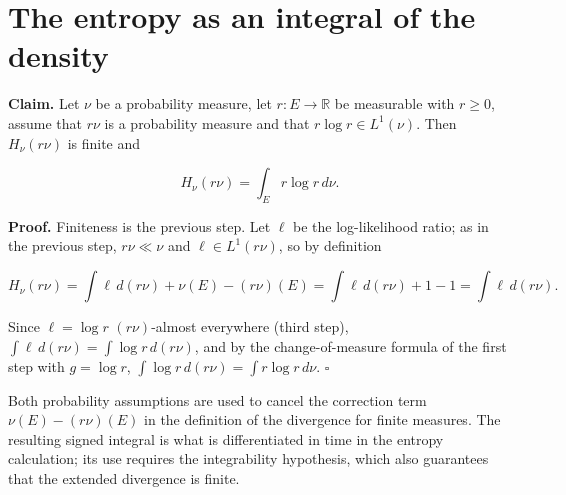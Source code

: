 \documentclass[11pt,a4paper]{article}
\begin{document}
\section{\texorpdfstring{The entropy as an integral of the density}{The entropy as an integral of the density}}


\textbf{Claim.} Let \(\nu\) be a probability measure, let \(r:E\to\mathbb R\) be measurable with \(r\ge0\), assume that \(r\nu\) is a probability measure and that \(r\log r\in L^1(\nu)\). Then \(H_\nu(r\nu)\) is finite and


\[H_\nu(r\nu)=\int_Er\log r\,d\nu.\]


\textbf{Proof.} Finiteness is the previous step. Let \(\ell\) be the log-likelihood ratio; as in the previous step, \(r\nu\ll\nu\) and \(\ell\in L^1(r\nu)\), so by definition


\[H_\nu(r\nu)=\int\ell\,d(r\nu)+\nu(E)-(r\nu)(E)=\int\ell\,d(r\nu)+1-1=\int\ell\,d(r\nu).\]


Since \(\ell=\log r\) \((r\nu)\)-almost everywhere (third step), \(\int\ell\,d(r\nu)=\int\log r\,d(r\nu)\), and by the change-of-measure formula of the first step with \(g=\log r\), \(\int\log r\,d(r\nu)=\int r\log r\,d\nu\). \(\square\)




Both probability assumptions are used to cancel the correction term \(\nu(E)-(r\nu)(E)\) in the definition of the divergence for finite measures. The resulting signed integral is what is differentiated in time in the entropy calculation; its use requires the integrability hypothesis, which also guarantees that the extended divergence is finite.
\end{document}
